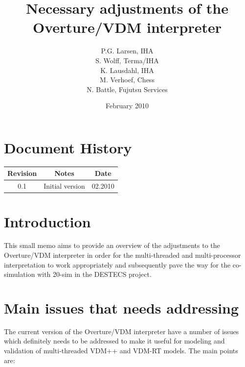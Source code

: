 \documentclass{overturerep}
\title{Necessary adjustments of the Overture/VDM interpreter}
\author{P.G. Larsen, IHA \\
   S. Wolff, Terma/IHA \\
   K. Lausdahl, IHA \\
   M. Verhoef, Chess\\
   N. Battle, Fujutsu Services
}
\date{February 2010}
\begin{document}
{}     

\maketitle
\tableofcontents
\newpage

\section*{Document History}
\begin{center}
\begin{tabular}{|c|c|c|}
\hline
\textbf{Revision} & \textbf{Notes} & \textbf{Date} \\ \hline
0.1 & Initial version & 02.2010 \\ \hline
\end{tabular}
\end{center}

\newpage

\setcounter{page}{1}

\section{Introduction}

This small memo aims to provide an overview of the adjustments to the
Overture/VDM interpreter in order for the multi-threaded and
multi-processor interpretation to work appropriately and subsequently
pave the way for the co-simulation with 20-sim in the DESTECS project.

\section{Main issues that needs addressing}

The current version of the Overture/VDM interpreter have a number of
issues which definitely needs to be addressed to make it useful for modeling
and validation of multi-threaded VDM++ and VDM-RT models. The main
points are:
\end{document}
